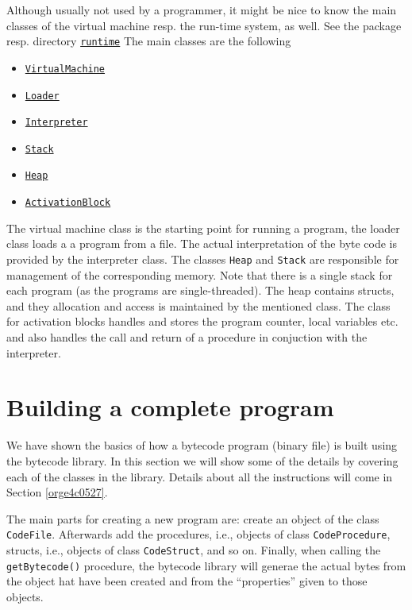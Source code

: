 \documentclass[11pt]{article}
\begin{document}
Although usually not used by a programmer, it might be nice to know the
main classes of the virtual machine resp. the run-time system, as well. See
the package resp. directory \href{../../../material/oblig2-patch/src/runtime/}{\texttt{runtime}} The main classes are the following

\begin{itemize}
\item \href{../../../material/oblig2-patch/src/runtime/VirtualMachine.java}{\texttt{VirtualMachine}}
\item \href{../../../material/oblig2-patch/src/runtime/Loader.java}{\texttt{Loader}}
\item \href{../../../material/oblig2-patch/src/runtime/Interpreter.java}{\texttt{Interpreter}}
\item \href{../../../material/oblig2-patch/src/runtime/Stack.java}{\texttt{Stack}}
\item \href{../../../material/oblig2-patch/src/runtime/Heap.java}{\texttt{Heap}}
\item \href{../../../material/oblig2-patch/src/runtime/ActivationBlock.java}{\texttt{ActivationBlock}}
\end{itemize}

The virtual machine class is the starting point for running a program, the
loader class loads a a program from a file. The actual interpretation of
the byte code is provided by the interpreter class. The classes \texttt{Heap} and
\texttt{Stack} are responsible for management of the corresponding memory. Note
that there is a single stack for each program (as the programs are
single-threaded). The heap contains structs, and they allocation and access
is maintained by the mentioned class. The class for activation blocks
handles and stores the program counter, local variables etc. and also
handles the call and return of a procedure in conjuction with the
interpreter.

\section{Building a complete program}
\label{sec:org2a461d5}

We have shown the basics of how a bytecode program (binary file) is built
using the bytecode library. In this section we will show some of the
details by covering each of the classes in the library. Details about all
the instructions will come in Section \ref{orge4c0527}.

The main parts for creating a new program are: create an object of the
class \texttt{CodeFile}. Afterwards add the procedures, i.e., objects of class
\texttt{CodeProcedure}, structs, i.e., objects of class \texttt{CodeStruct}, and so
on. Finally, when calling the \texttt{getBytecode()} procedure, the bytecode
library will generae the actual bytes from the object hat have been created
and from the ``properties'' given to those objects.
\end{document}
